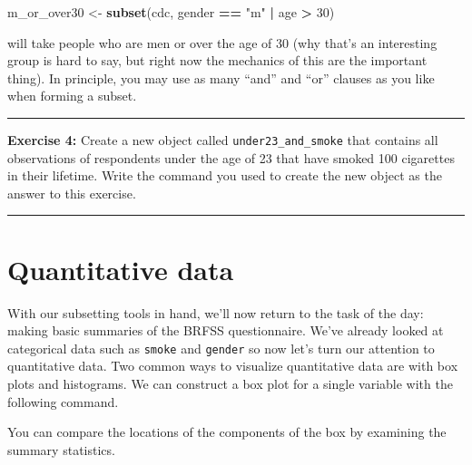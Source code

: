 \documentclass[]{book}
\newenvironment{Shaded}{\begin{snugshade}}{\end{snugshade}}
\newcommand{\DecValTok}[1]{\textcolor[rgb]{0.00,0.00,0.81}{#1}}
\newcommand{\KeywordTok}[1]{\textcolor[rgb]{0.13,0.29,0.53}{\textbf{#1}}}
\newcommand{\NormalTok}[1]{#1}
\newcommand{\OperatorTok}[1]{\textcolor[rgb]{0.81,0.36,0.00}{\textbf{#1}}}
\newcommand{\StringTok}[1]{\textcolor[rgb]{0.31,0.60,0.02}{#1}}
\theoremstyle{definition}
\theoremstyle{definition}
\theoremstyle{definition}
\theoremstyle{remark}
\begin{document}
\begin{Shaded}
\begin{Highlighting}[]
\NormalTok{m_or_over30 <-}\StringTok{ }\KeywordTok{subset}\NormalTok{(cdc, gender }\OperatorTok{==}\StringTok{ "m"} \OperatorTok{|}\StringTok{ }\NormalTok{age }\OperatorTok{>}\StringTok{ }\DecValTok{30}\NormalTok{)}
\end{Highlighting}
\end{Shaded}

will take people who are men or over the age of 30 (why that's an
interesting group is hard to say, but right now the mechanics of this
are the important thing). In principle, you may use as many ``and'' and
``or'' clauses as you like when forming a subset.

\begin{center}\rule{0.5\linewidth}{\linethickness}\end{center}

\textbf{Exercise 4:} Create a new object called
\texttt{under23\_and\_smoke} that contains all observations of
respondents under the age of 23 that have smoked 100 cigarettes in their
lifetime. Write the command you used to create the new object as the
answer to this exercise.

\begin{center}\rule{0.5\linewidth}{\linethickness}\end{center}

\hypertarget{quantitative-data}{%
\section{Quantitative data}\label{quantitative-data}}

With our subsetting tools in hand, we'll now return to the task of the
day: making basic summaries of the BRFSS questionnaire. We've already
looked at categorical data such as \texttt{smoke} and \texttt{gender} so
now let's turn our attention to quantitative data. Two common ways to
visualize quantitative data are with box plots and histograms. We can
construct a box plot for a single variable with the following command.

\begin{Shaded}
\end{Shaded}

You can compare the locations of the components of the box by examining
the summary statistics.
\end{document}
